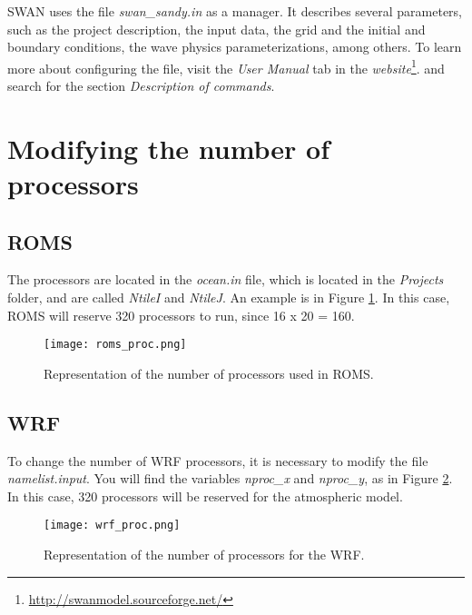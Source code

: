 \noindent SWAN uses the file \textit{swan\_sandy.in} as a manager. It describes several parameters,
such as the project description, the input data, the grid and the initial and boundary conditions, the
wave physics parameterizations, among others. To learn more about configuring the file, visit the \textit{User Manual} tab
in the \textcolor{bleu_cite}{\textit{website}\footnote{\textcolor{bleu_cite}{\href{http://swanmodel.sourceforge.net/}{http://swanmodel.sourceforge.net/}}}}.
and search for the section \textit{Description of commands}.
\bigskip

\section{Modifying the number of processors}
\bigskip

\subsection{ROMS}
\bigskip

\noindent The processors are located in the \textit{ocean.in} file, which is located in the \textit{Projects} folder,
and are called \textit{NtileI} and \textit{NtileJ}. An example is in Figure \textcolor{bleu_cite}{\ref{romsproc}}.
In this case, ROMS will reserve 320 processors to run, since 16 x 20 = 160.

\bigskip

\begin{figure}[H]
    \centering
    \texttt{[image: roms\_proc.png]}
    \caption{Representation of the number of processors used in ROMS.}
    \label{romsproc}
\end{figure}
\bigskip

\subsection{WRF}
\bigskip

\noindent To change the number of WRF processors, it is necessary to modify the file \textit{namelist.input}.
You will find the variables \textit{nproc\_x} and \textit{nproc\_y}, as in Figure \textcolor{bleu_cite}{\ref{procswrf}}.
In this case, 320 processors will be reserved for the atmospheric model.

\begin{figure}[H]
    \centering
    \texttt{[image: wrf\_proc.png]}
    \caption{Representation of the number of processors for the WRF.}
    \label{procswrf}
\end{figure}
\bigskip

